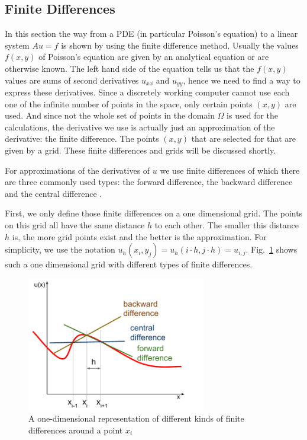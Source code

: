 \subsection{Finite Differences}
In this section the way from a PDE (in particular Poisson's equation) to a linear system $Au = f$ is shown by using the finite difference method. Usually the values $f(x,y)$ of Poisson's equation are given by an analytical equation or are otherwise known. The left hand side of the equation tells us that the $f(x,y)$ values are sums of second derivatives $u_{xx}$ and $u_{yy}$, hence we need to find a way to express these derivatives. Since a discretely working computer cannot use each one of the infinite number of points in the space, only certain points $(x,y)$ are used. And since not the whole set of points in the domain $\Omega$ is used for the calculations, the derivative we use is actually just an approximation of the derivative: the finite difference. The points $(x,y)$ that are selected for that are given by a grid. These finite differences and grids will be discussed shortly. 

For approximations of the  derivatives of $u$ we use finite differences of which there are three commonly used types: the forward difference, the backward difference and the central difference \cite{langer}. 

First, we only define those finite differences on a one dimensional grid. The points on this grid all have the same distance $h$ to each other. The smaller this distance $h$ is, the more grid points exist and the better is the approximation. For simplicity, we use the notation $u_h(x_i, y_j) = u_h(i\cdot h,j\cdot h) = u_{i,j}$. Fig.~\ref{fig:finite_differences} shows such a one dimensional grid with different types of finite differences.


\begin{figure}[h]
	\centering
	\includegraphics[width=0.7\textwidth]{chapters/chapter01/finite_differences.pdf}
	\caption{A one-dimensional representation of different kinds of finite differences around a point $x_i$}
	\label{fig:finite_differences}
\end{figure}

